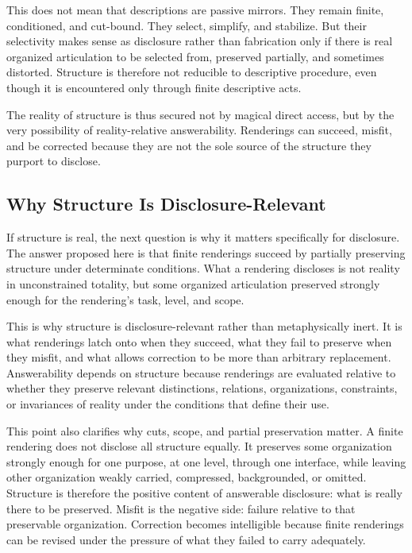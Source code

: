 \documentclass[11pt]{article}
\begin{document}
This does not mean that descriptions are passive mirrors. They remain finite, conditioned, and cut-bound. They select, simplify, and stabilize. But their selectivity makes sense as disclosure rather than fabrication only if there is real organized articulation to be selected from, preserved partially, and sometimes distorted. Structure is therefore not reducible to descriptive procedure, even though it is encountered only through finite descriptive acts.

The reality of structure is thus secured not by magical direct access, but by the very possibility of reality-relative answerability. Renderings can succeed, misfit, and be corrected because they are not the sole source of the structure they purport to disclose.

\subsection{Why Structure Is Disclosure-Relevant}

If structure is real, the next question is why it matters specifically for disclosure. The answer proposed here is that finite renderings succeed by partially preserving structure under determinate conditions. What a rendering discloses is not reality in unconstrained totality, but some organized articulation preserved strongly enough for the rendering's task, level, and scope. \cite{FriggHartmann2025ModelsScienceSEP,Giere2006ScientificPerspectivism}

This is why structure is disclosure-relevant rather than metaphysically inert. It is what renderings latch onto when they succeed, what they fail to preserve when they misfit, and what allows correction to be more than arbitrary replacement. Answerability depends on structure because renderings are evaluated relative to whether they preserve relevant distinctions, relations, organizations, constraints, or invariances of reality under the conditions that define their use.

This point also clarifies why cuts, scope, and partial preservation matter. A finite rendering does not disclose all structure equally. It preserves some organization strongly enough for one purpose, at one level, through one interface, while leaving other organization weakly carried, compressed, backgrounded, or omitted. Structure is therefore the positive content of answerable disclosure: what is really there to be preserved. Misfit is the negative side: failure relative to that preservable organization. Correction becomes intelligible because finite renderings can be revised under the pressure of what they failed to carry adequately.
\end{document}
